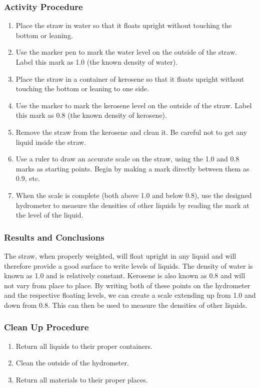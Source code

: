 \subsubsection*{Activity Procedure}
\begin{enumerate}
\item{Place the straw in water so that it floats upright without touching the bottom or leaning.} 
\item{Use the marker pen to mark the water level on the outside of the straw. Label this mark as 1.0 (the known density of water).} 
\item{Place the straw in a container of kerosene so that it floats upright without touching the bottom or leaning to one side.} 
\item{Use the marker to mark the kerosene level on the outside of the straw. Label this mark as 0.8 (the known density of kerosene).}
\item{Remove the straw from the kerosene and clean it. Be careful not to get any liquid inside the straw.} 
\item{Use a ruler to draw an accurate scale on the straw, using the 1.0 and 0.8 marks as starting points. Begin by making a mark directly between them as 0.9, etc.} 
\item{When the scale is complete (both above 1.0 and below 0.8), use the designed hydrometer to measure the densities of other liquids by reading the mark at the level of the liquid.} 
\end{enumerate}

\subsubsection*{Results and Conclusions}
The straw, when properly weighted, will float upright in any liquid and will therefore provide a good surface to write levels of liquids. The density of water is known as 1.0 and is relatively constant. Kerosene is also known as 0.8 and will not vary from place to place. By writing both of these points on the hydrometer and the respective floating levels, we can create a scale extending up from 1.0 and down from 0.8. This can then be used to measure the densities of other liquids.  

\subsubsection*{Clean Up Procedure}
\begin{enumerate}
\item{Return all liquids to their proper containers.} 
\item{Clean the outside of the hydrometer.} 
\item{Return all materials to their proper places.} 
\end{enumerate}

